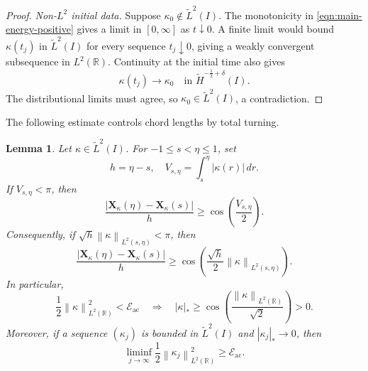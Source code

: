 \documentclass[11pt,reqno]{amsart}
\theoremstyle{plain}
\newtheorem{lemma}[theorem]{Lemma}
\theoremstyle{definition}
\numberwithin{equation}{section}
\newcommand{\paren}[1]{\left(#1\right)}
\newcommand{\mc}[1]{\mathcal{#1}}
\newcommand{\wt}[1]{\widetilde{#1}}
\newcommand{\bm}[1]{\boldsymbol{#1}}
\newcommand{\abs}[1]{\left\lvert #1 \right\rvert}
\newcommand{\norm}[1]{\left\lVert #1 \right\rVert}
\newcommand{\R}{\mathbb{R}}
\newcommand{\xk}{\bm X_\kappa}
\newcommand{\thi}[1]{\wt H^{#1}(I)}
\begin{document}
\begin{proof}
\emph{Non-$L^2$ initial data.}
Suppose $\kappa_0\notin\wt L^2(I)$. The monotonicity in
\eqref{eqn:main-energy-positive} gives a limit in $[0,\infty]$ as
$t\downarrow0$. A finite limit would bound $\kappa(t_j)$ in $\wt L^2(I)$
for every sequence $t_j\downarrow0$, giving a weakly convergent
subsequence in $L^2(\R)$. Continuity at the initial time also gives
\begin{equation}
    \kappa(t_j)\longrightarrow\kappa_0
    \quad\text{in }\thi{-\frac12+\delta}.
\end{equation}
The distributional limits must agree, so $\kappa_0\in\wt L^2(I)$,
a contradiction.
\end{proof}

The following estimate controls chord lengths by total turning.

\begin{lemma}
\label{lem:energy-arc-chord}
Let $\kappa\in\wt L^2(I)$. For $-1\le s<\eta\le1$, set
\begin{equation}
    h=\eta-s,
    \quad
    V_{s,\eta}=\int_s^\eta\abs{\kappa(r)}\,dr.
\end{equation}
If $V_{s,\eta}<\pi$, then
\begin{equation}\label{eqn:turning-chord-bound}
    \frac{\abs{\xk(\eta)-\xk(s)}}{h}
    \ge\cos\paren{\frac{V_{s,\eta}}2}.
\end{equation}
Consequently, if $\sqrt h\norm{\kappa}_{L^2(s,\eta)}<\pi$, then
\begin{equation}\label{eqn:l2-chord-bound}
    \frac{\abs{\xk(\eta)-\xk(s)}}{h}
    \ge
    \cos\paren{
        \frac{\sqrt h}{2}\norm{\kappa}_{L^2(s,\eta)}
    }.
\end{equation}
In particular,
\begin{equation}\label{eqn:energy-arc-chord-bound}
    \frac12\norm{\kappa}_{L^2(\R)}^2<\mc E_{\mathrm{ac}}
    \quad\Longrightarrow\quad
    \abs{\kappa}_*
    \ge
    \cos\paren{\frac{\norm{\kappa}_{L^2(\R)}}{\sqrt2}}
    >0.
\end{equation}
Moreover, if a sequence $(\kappa_j)$ is bounded in $\wt L^2(I)$ and
$\abs{\kappa_j}_*\to0$, then
\begin{equation}\label{eqn:sequential-energy-barrier}
    \liminf_{j\to\infty}
    \frac12\norm{\kappa_j}_{L^2(\R)}^2
    \ge\mc E_{\mathrm{ac}}.
\end{equation}
\end{lemma}
\end{document}
